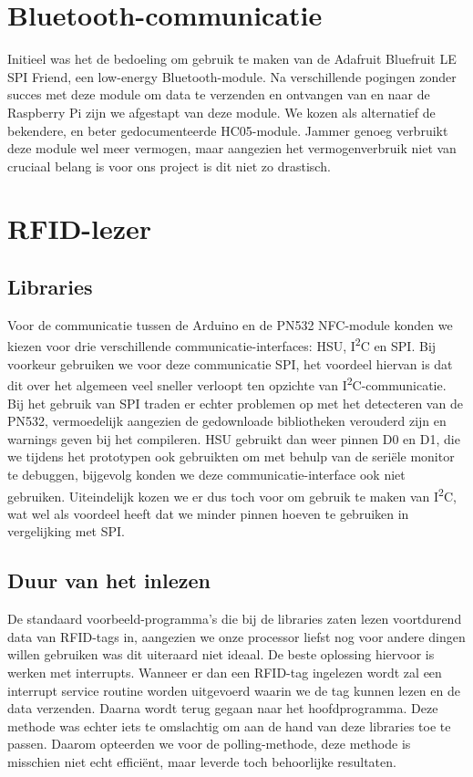 \section{Bluetooth-communicatie}
Initieel was het de bedoeling om gebruik te maken van de Adafruit Bluefruit LE SPI Friend, een low-energy Bluetooth-module. Na verschillende pogingen zonder succes met deze module om data te verzenden en ontvangen van en naar de Raspberry Pi zijn we afgestapt van deze module. We kozen als alternatief de bekendere, en beter gedocumenteerde HC05-module. Jammer genoeg verbruikt deze module wel meer vermogen, maar aangezien het vermogenverbruik niet van cruciaal belang is voor ons project is dit niet zo drastisch.

\section{RFID-lezer}
\subsection{Libraries}
Voor de communicatie tussen de Arduino en de PN532 NFC-module konden we kiezen voor drie verschillende communicatie-interfaces: HSU, I\textsuperscript{2}C en SPI.
Bij voorkeur gebruiken we voor deze communicatie SPI, het voordeel hiervan is dat dit over het algemeen veel sneller verloopt ten opzichte van I\textsuperscript{2}C-communicatie. Bij het gebruik van SPI traden er echter problemen op met het detecteren van de PN532, vermoedelijk aangezien de gedownloade bibliotheken verouderd zijn en warnings geven bij het compileren.
HSU gebruikt dan weer pinnen D0 en D1, die we tijdens het prototypen ook gebruikten om met behulp van de seri\"ele monitor te debuggen, bijgevolg konden we deze communicatie-interface ook niet gebruiken. Uiteindelijk kozen we er dus toch voor om gebruik te maken van I\textsuperscript{2}C, wat wel als voordeel heeft dat we minder pinnen hoeven te gebruiken in vergelijking met SPI.
\subsection{Duur van het inlezen}
De standaard voorbeeld-programma's die bij de libraries zaten lezen voortdurend data van RFID-tags in, aangezien we onze processor liefst nog voor andere dingen willen gebruiken was dit uiteraard niet ideaal. De beste oplossing hiervoor is werken met interrupts. Wanneer er dan een RFID-tag ingelezen wordt zal een interrupt service routine worden uitgevoerd waarin we de tag kunnen lezen en de data verzenden. Daarna wordt terug gegaan naar het hoofdprogramma. Deze methode was echter iets te omslachtig om aan de hand van deze libraries toe te passen. Daarom opteerden we voor de polling-methode, deze methode is misschien niet echt effici\"ent, maar leverde toch behoorlijke resultaten. 

